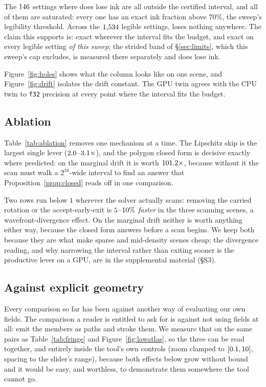 The $146$ settings where \ours{} does lose ink are all outside the
certified interval, and all of them are saturated: every one has an exact ink
fraction above $70\%$, the sweep's legibility threshold. Across the
$1{,}534$ legible settings, \ours{} loses nothing anywhere. The claim this
supports is: exact wherever the interval fits the budget, and exact on every
legible setting \emph{of this sweep}; the strided band of
\S\ref{sec:limits}, which this sweep's cap excludes, is measured there
separately and does lose ink.

Figure~\ref{fig:holes} shows what the \sweep{} column looks like on one scene, and Figure~\ref{fig:drift} isolates the drift constant. The
GPU twin agrees with the CPU twin to \texttt{f32} precision at every point where
the interval fits the budget.

\subsection{Ablation}



Table~\ref{tab:ablation} removes one mechanism at a time. The Lipschitz skip is
the largest single lever ($2.0$--$3.1\times$), and the polygon closed
form is decisive exactly where predicted: on the marginal drift it is worth
$101.2\times$, because without it the scan must walk a $2^{16}$-wide
interval to find an answer that Proposition~\ref{prop:closed} reads off in one
comparison.

Two rows run below $1$ wherever the solver actually scans: removing the carried
rotation or the accept-early-exit is $5$--$10\%$ \emph{faster} in
the three scanning scenes, a wavefront-divergence effect. On the marginal drift
neither is worth anything either way, because the closed form answers before a
scan begins. We keep both because they are what make sparse and mid-density
scenes cheap; the divergence reading, and why narrowing the interval rather than
exiting sooner is the productive lever on a GPU, are in the supplemental
material (\S S3).

\subsection{Against explicit geometry}
\label{sec:vector}

Every comparison so far has been against another way of evaluating our own
fields. The comparison a reader is entitled to ask for is against not using
fields at all: emit the members as paths and stroke them. We measure that on the
same \vecScenes{} pairs as Table~\ref{tab:fringe} and
Figure~\ref{fig:lawatlas}, so the three can be read together, and entirely inside
the tool's own controls (zoom clamped to $[0.1, 10]$, spacing to
the slider's range), because both effects below grow without bound and it would
be easy, and worthless, to demonstrate them somewhere the tool cannot go.

